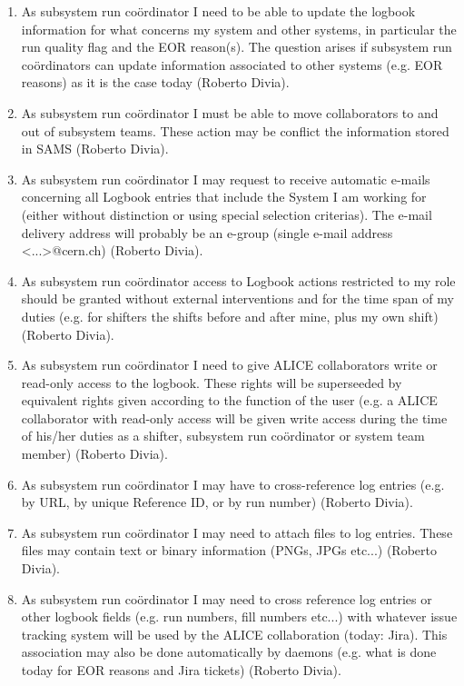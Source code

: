 \begin{enumerate}
  \item As subsystem run co\"ordinator I need to be able to update the logbook information for what concerns my system and other systems, in particular the run quality flag and the EOR reason(s). The question arises if subsystem run co\"ordinators can update information associated to other systems (e.g. EOR reasons) as it is the case today (Roberto Divia).
  \item As subsystem run co\"ordinator I must be able to move collaborators to and out of subsystem teams. These action may be conflict the information stored in SAMS (Roberto Divia).
  \item As subsystem run co\"ordinator I may request to receive automatic e-mails concerning all Logbook entries that include the System I am working for (either without distinction or using special selection criterias). The e-mail delivery address will probably be an e-group (single e-mail address <...>@cern.ch) (Roberto Divia).
  \item As subsystem run co\"ordinator access to Logbook actions restricted to my role should be granted without external interventions and for the time span of my duties (e.g. for shifters the shifts before and after mine, plus my own shift) (Roberto Divia).
  \item As subsystem run co\"ordinator I need to give ALICE collaborators write or read-only access to the logbook. These rights will be superseeded by equivalent rights given according to the function of the user (e.g. a ALICE collaborator with read-only access will be given write access during the time of his/her duties as a shifter, subsystem run co\"ordinator or system team member) (Roberto Divia).
  \item As subsystem run co\"ordinator I may have to cross-reference log entries (e.g. by URL, by unique Reference ID, or by run number)  (Roberto Divia).
  \item  As subsystem run co\"ordinator I may need to attach files to log entries. These files may contain text or binary information (PNGs, JPGs etc...) (Roberto Divia).
  \item As subsystem run co\"ordinator I may need to cross reference log entries or other logbook fields (e.g. run numbers, fill numbers etc...) with whatever issue tracking system will be used by the ALICE collaboration (today: Jira). This association may also be done automatically by daemons (e.g. what is done today for EOR reasons and Jira tickets) (Roberto Divia).

\end{enumerate}

